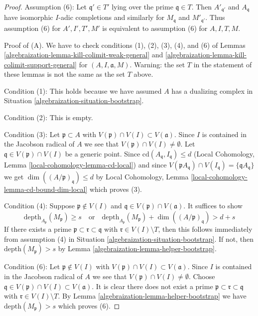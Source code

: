 \begin{proof}
\medskip\noindent
Assumption (6): Let $\mathfrak q' \in T'$ lying over the
prime $\mathfrak q \in T$. Then $A'_{\mathfrak q'}$
and $A_\mathfrak q$ have isomorphic $I$-adic completions
and similarly for $M_\mathfrak q$ and $M'_{\mathfrak q'}$.
Thus assumption (6) for $A', I', T', M'$ is equivalent
to assumption (6) for $A, I, T, M$.

\medskip\noindent
Proof of (A). We have to check conditions (1), (2), (3), (4), and (6)
of Lemmas \ref{algebraization-lemma-kill-colimit-weak-general} and
\ref{algebraization-lemma-kill-colimit-support-general} for
$(A, I, \mathfrak a, M)$. Warning: the set $T$ in the statement of
these lemmas is not the same as the set $T$ above.

\medskip\noindent
Condition (1): This holds because we have assumed $A$ has a dualizing complex in
Situation \ref{algebraization-situation-bootstrap}.

\medskip\noindent
Condition (2): This is empty.

\medskip\noindent
Condition (3): Let $\mathfrak p \subset A$ with
$V(\mathfrak p) \cap V(I) \subset V(\mathfrak a)$.
Since $I$ is contained in the Jacobson radical of $A$ we see
that $V(\mathfrak p) \cap V(I) \not = \emptyset$.
Let $\mathfrak q \in V(\mathfrak p) \cap V(I)$ be a generic point.
Since $\text{cd}(A_\mathfrak q, I_\mathfrak q) \leq d$
(Local Cohomology, Lemma \ref{local-cohomology-lemma-cd-local}) and since
$V(\mathfrak p A_\mathfrak q) \cap V(I_\mathfrak q) =
\{\mathfrak q A_\mathfrak q\}$ we get
$\dim((A/\mathfrak p)_\mathfrak q) \leq d$ by Local Cohomology,
Lemma \ref{local-cohomology-lemma-cd-bound-dim-local} which proves (3).

\medskip\noindent
Condition (4): Suppose $\mathfrak p \not \in V(I)$ and
$\mathfrak q \in V(\mathfrak p) \cap V(\mathfrak a)$.
It suffices to show
$$
\text{depth}_{A_\mathfrak p}(M_\mathfrak p) \geq s
\quad\text{or}\quad
\text{depth}_{A_\mathfrak p}(M_\mathfrak p) +
\dim((A/\mathfrak p)_\mathfrak q) > d + s
$$
If there exists a prime $\mathfrak p \subset \mathfrak r \subset \mathfrak q$
with $\mathfrak r \in V(I) \setminus T$, then this follows
immediately from assumption (4) in Situation \ref{algebraization-situation-bootstrap}.
If not, then $\text{depth}(M_\mathfrak p) > s$ by
Lemma \ref{algebraization-lemma-helper-bootstrap}.

\medskip\noindent
Condition (6): Let $\mathfrak p \not \in V(I)$ with
$V(\mathfrak p) \cap V(I) \subset V(\mathfrak a)$.
Since $I$ is contained in the Jacobson radical of $A$ we see
that $V(\mathfrak p) \cap V(I) \not = \emptyset$.
Choose $\mathfrak q \in V(\mathfrak p) \cap V(I) \subset V(\mathfrak a)$.
It is clear there does not exist a prime
$\mathfrak p \subset \mathfrak r \subset \mathfrak q$
with $\mathfrak r \in V(I) \setminus T$.
By Lemma \ref{algebraization-lemma-helper-bootstrap} we have
$\text{depth}(M_\mathfrak p) > s$ which proves (6).


\end{proof}
